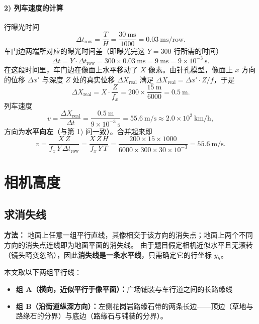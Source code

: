 \documentclass[11pt,a4paper]{ctexart}
\begin{document}
\paragraph{2) 列车速度的计算}

行曝光时间
\begin{equation}
\Delta t_{\text{row}}=\frac{T}{H}=\frac{30\ \text{ms}}{1000}=0.03\ \text{ms/row}.
\end{equation}
车门边两端所对应的曝光时间差（即曝光完这 $Y=300$ 行所需的时间）
\begin{equation}
\Delta t=Y\cdot\Delta t_{\text{row}}=300\times 0.03\ \text{ms}=9\ \text{ms}=9\times10^{-3}\ \text{s}.
\end{equation}
在这段时间里，车门边在像面上水平移动了 $X$ 像素。由针孔模型，像面上 $x$ 方向的位移 $\Delta x'$ 与深度 $Z$ 处的真实位移 $\Delta X_{\text{real}}$ 满足
$\Delta X_{\text{real}}=\Delta x'\cdot Z/f$，于是
\begin{equation}
\Delta X_{\text{real}}=X\cdot\frac{Z}{f_x}=200\times\frac{15\ \text{m}}{6000}=0.5\ \text{m}.
\end{equation}
列车速度
\begin{equation}
v=\frac{\Delta X_{\text{real}}}{\Delta t}=\frac{0.5\ \text{m}}{9\times10^{-3}\ \text{s}}
=55.6\ \text{m/s}\approx 2.0\times10^{2}\ \text{km/h},
\end{equation}
方向为\textbf{水平向左}（与第 1) 问一致）。合并起来即
\begin{equation}
v=\frac{X\,Z}{f_x\,Y\,\Delta t_{\text{row}}}=\frac{X\,Z\,H}{f_x\,Y\,T}
=\frac{200\times15\times1000}{6000\times300\times30\times10^{-3}}=55.6\ \text{m/s}.
\end{equation}

\section{相机高度}

\subsection{求消失线}

\textbf{方法：} 地面上任意一组平行直线，其像相交于该方向的消失点；地面上两个不同方向的消失点连线即为地面平面的消失线。
由于题目假定相机近似水平且无滚转（镜头畸变忽略），因此\textbf{消失线是一条水平线}，只需确定它的行坐标 $y_h$。

本文取以下两组平行线：
\begin{itemize}
  \item \textbf{组 A（横向，近似平行于像平面）：}广场铺装与车行道之间的长路缘线
  \item \textbf{组 B（沿街道纵深方向）：}左侧花岗岩路缘石带的两条长边——顶边（草地与路缘石的分界）与底边（路缘石与铺装的分界）。
\end{itemize}
\end{document}
